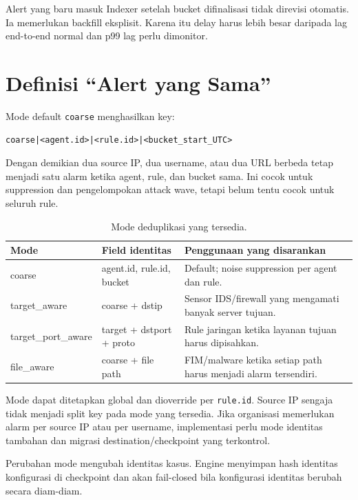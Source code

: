 \documentclass[11pt,a4paper,oneside]{report}
\DeclareRobustCommand{\code}[1]{\nolinkurl{#1}}
\begin{document}
Alert yang baru masuk Indexer setelah bucket difinalisasi tidak direvisi otomatis.
Ia memerlukan backfill eksplisit. Karena itu delay harus lebih besar daripada lag
end-to-end normal dan p99 lag perlu dimonitor.

\chapter{Definisi ``Alert yang Sama''}

Mode default \code{coarse} menghasilkan key:

\begin{lstlisting}
coarse|<agent.id>|<rule.id>|<bucket_start_UTC>
\end{lstlisting}

Dengan demikian dua source IP, dua username, atau dua URL berbeda tetap menjadi
satu alarm ketika agent, rule, dan bucket sama. Ini cocok untuk suppression dan
pengelompokan attack wave, tetapi belum tentu cocok untuk seluruh rule.

\begin{table}[ht]
\centering
\caption{Mode deduplikasi yang tersedia.}
\begin{tabularx}{\textwidth}{>{\ttfamily}l X X}
\toprule
\normalfont\textbf{Mode} & \textbf{Field identitas} & \textbf{Penggunaan yang disarankan}\\
\midrule
coarse & agent.id, rule.id, bucket & Default; noise suppression per agent dan rule.\\
target\_aware & coarse + dstip & Sensor IDS/firewall yang mengamati banyak server tujuan.\\
target\_port\_aware & target + dstport + proto & Rule jaringan ketika layanan tujuan harus dipisahkan.\\
file\_aware & coarse + file path & FIM/malware ketika setiap path harus menjadi alarm tersendiri.\\
\bottomrule
\end{tabularx}
\end{table}

Mode dapat ditetapkan global dan dioverride per \code{rule.id}. Source IP sengaja
tidak menjadi split key pada mode yang tersedia. Jika organisasi memerlukan alarm
per source IP atau per username, implementasi perlu mode identitas tambahan dan
migrasi destination/checkpoint yang terkontrol.

Perubahan mode mengubah identitas kasus. Engine menyimpan hash identitas konfigurasi
di checkpoint dan akan fail-closed bila konfigurasi identitas berubah secara diam-diam.
\end{document}
